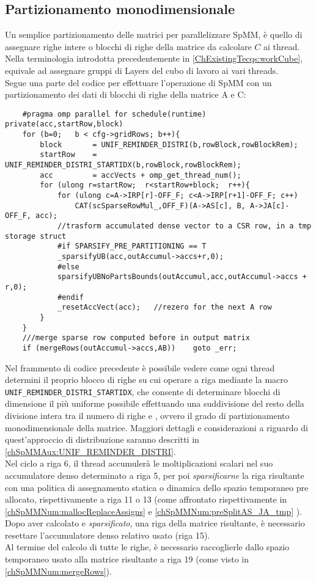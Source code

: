 \subsection{Partizionamento monodimensionale}
Un semplice partizionamento delle matrici per parallelizzare SpMM, è quello di 
assegnare righe intere o blocchi di righe della matrice da calcolare $C$ ai thread.\\
Nella terminologia introdotta precedentemente in \ref{ChExistingTecqs:workCube}, equivale ad
assegnare gruppi di Layers del cubo di lavoro ai vari threads.\\
Segue una parte del codice per effettuare l'operazione di SpMM con 
un partizionamento dei dati di blocchi di righe della matrice A e C:    \label{chSpMMNum:part1DGroup}
\begin{lstlisting}
    #pragma omp parallel for schedule(runtime) private(acc,startRow,block)
    for (b=0;   b < cfg->gridRows; b++){
        block		= UNIF_REMINDER_DISTRI(b,rowBlock,rowBlockRem);
        startRow	= UNIF_REMINDER_DISTRI_STARTIDX(b,rowBlock,rowBlockRem);
        acc			= accVects + omp_get_thread_num();
        for (ulong r=startRow;  r<startRow+block;  r++){
            for (ulong c=A->IRP[r]-OFF_F; c<A->IRP[r+1]-OFF_F; c++) 
                CAT(scSparseRowMul_,OFF_F)(A->AS[c], B, A->JA[c]-OFF_F, acc);
            //trasform accumulated dense vector to a CSR row, in a tmp storage struct
        	#if SPARSIFY_PRE_PARTITIONING == T
			_sparsifyUB(acc,outAccumul->accs+r,0);
			#else
        	sparsifyUBNoPartsBounds(outAccumul,acc,outAccumul->accs + r,0);
			#endif
            _resetAccVect(acc);   //rezero for the next A row
        }
    }
    ///merge sparse row computed before in output matrix
    if (mergeRows(outAccumul->accs,AB))    goto _err;
\end{lstlisting}
Nel frammento di codice precedente è possibile vedere come ogni thread determini 
il proprio blocco di righe su cui operare a riga mediante la macro \verb|UNIF_REMINDER_DISTRI_STARTIDX|,
che consente di determinare blocchi di dimensione il più uniforme possibile  
effettuando una suddivisione del resto della divisione intera tra il numero di righe e ,
ovvero il grado di partizionamento monodimensionale della matrice.
Maggiori dettagli e considerazioni a riguardo di quest'approccio di distribuzione saranno
descritti in \ref{chSpMMAux:UNIF_REMINDER_DISTRI}.\\
Nel ciclo a riga 6, il thread accumulerà le moltiplicazioni scalari nel suo accumulatore denso
determinato a riga 5, per poi \emph{sparsificarne} la riga risultante con
una politica di assegnamento statica o dinamica dello spazio temporaneo pre allocato,
rispettivamente a riga 11 o 13 (come affrontato rispettivamente in 
\ref{chSpMMNum:mallocReplaceAssigns} e \ref{chSpMMNum:preSplitAS_JA_tmp} ).\\
Dopo aver calcolato e \emph{sparsificato}, una riga della matrice risultante, è 
necessario resettare l'accumulatore denso relativo usato (riga 15).\\
Al termine del calcolo di tutte le righe, è necessario raccoglierle dallo spazio temporaneo usato
alla matrice risultante a riga 19 (come visto in \ref{chSpMMNum:mergeRows}).\\

